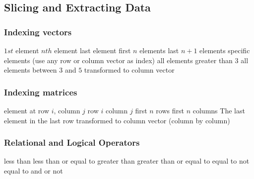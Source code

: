 \subsection{Slicing and Extracting Data }{}
\subsubsection{Indexing vectors}{}
	{$1st$ element}
	{$nth$ element}
	{last element}
	{first $n$ elements}
	{last $n+1$ elements}
	{specific elements (use any row or column vector as index)}
	{all elements greater than $3$}
	{all elements between $3$ and $5$}
	{transformed to column vector}

\subsubsection{Indexing matrices}{}
	{element at row $i$, column $j$}
	{row $i$}
	{column $j$}
	{first $n$ rows}
	{first $n$ columns}
	{The last element in the last row}
	{transformed to column vector (column by column)}

\subsubsection{Relational and Logical Operators}{}
\cmdOper{<}	{less than}
\cmdOper{<==}	{less than or equal to}
\cmdOper{>}	{greater than}
\cmdOper{>==}	{greater than or equal to}
\cmdOper{==}	{equal to}
\cmdOper{\tild=}	{not equal to}
\cmdOper{\&}	{and}
\cmdOper{!}	{or}
\cmdOper{\tild}	{not}

